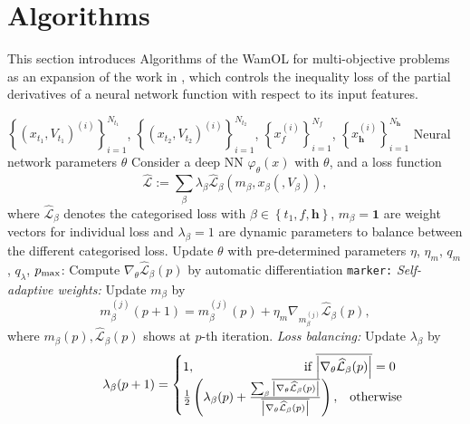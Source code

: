 \documentclass[sigconf, authorversion=true, nonacm=true]{acmart}
\begin{document}
\section{Algorithms}
\label{section: Algorithms}
This section introduces Algorithms of the WamOL for multi-objective problems as an expansion of the work in \cite{raissi2019physics}, which controls the inequality loss of the partial derivatives of a neural network function with respect to its input features.
\begin{algorithm}%
\caption{Whack-a-mole Online Learning (WamOL)}
\label{alg: WamOL}
\begin{algorithmic}
\Require \hspace{-5pt} $\left\{\left(x_{t_1}, V_{t_1}\right)^{(i)}\right\}_{i=1}^{N_{t_1}}$, $\left\{\left(x_{t_2}, V_{t_2}\right)^{(i)}\right\}_{i=1}^{N_{t_2}}$, $\left\{x_f^{(i)} \right\}_{i=1}^{N_f}$, $\left\{x_\textbf{h}^{(i)} \right\}_{i=1}^{N_\textbf{h}}$ 
\Ensure Neural network parameters $\theta$
\vspace{3pt}\State Consider a deep NN $\varphi_\theta(x)$ with $\theta$, and a loss function 
$$\widehat{\mathcal{L}}:= \sum_\beta \lambda_{\beta} \widehat{\mathcal{L}}_{\beta}\left(m_\beta, x_\beta \left(, V_\beta\right)\right),$$
where $\widehat{\mathcal{L}}_{\beta}$ denotes the categorised loss with $\beta \in \left\{t_1,f,\textbf{h}\right\}$, $m_\beta=\textbf{1}$ are weight vectors for individual loss and $\lambda_\beta=1$ are dynamic parameters to balance between the different categorised loss.
\vspace{3pt}\State Update $\theta$ with pre-determined parameters $\eta$, $\eta_m$, $q_m$, $q_\lambda$, $p_{\rm max}$:
    \State Compute $\nabla_{\theta} \widehat{\mathcal{L}}_\beta(p)$ by automatic differentiation
    \Label \;\;\;\;  \texttt{marker:}
        \State \textit{Self-adaptive weights:} Update $m_\beta$ by$$m_\beta^{(j)}(p+1) = m_\beta^{(j)}(p) + \eta_m \nabla_{m_\beta^{(j)}} \widehat{\mathcal{L}}_\beta(p),$$
        \State where $m_\beta(p), \widehat{\mathcal{L}}_\beta(p)$ shows at $p$-th iteration.
    \EndIf
        \State \textit{Loss balancing:} Update $\lambda_\beta$ by {\small $$\hspace{28pt}\lambda_\beta(p+1) = \begin{cases}{1}, & \text{\hspace{-36pt}if $\overline{\abs{\nabla_\theta\widehat{\mathcal{L}}_\beta(p)}}=0$} \\ \frac{1}{2}\left(\lambda_\beta(p) + \frac{\sum_\beta \overline{\abs{\nabla_\theta\widehat{\mathcal{L}}_\beta(p)}}}{\overline{\abs{\nabla_\theta\widehat{\mathcal{L}}_\beta(p)}}}\right), & \text{otherwise} \end{cases}$$}

\end{algorithmic}
\end{algorithm}
\end{document}

